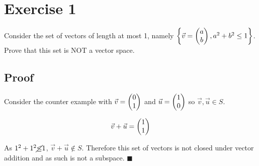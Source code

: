 \section*{Exercise 1}

Consider the set of vectors of length at most 1, namely $\left\{ \vec{v} =  \begin{pmatrix} a\\b \end{pmatrix} , a^2 + b^2 \leq 1 \right\}$. Prove that this set is NOT a vector space.

\subsection*{Proof}

Consider the counter example with $\vec{v} =  \begin{pmatrix} 0\\1 \end{pmatrix} $ and $\vec{u} =  \begin{pmatrix} 1\\0 \end{pmatrix} $ so $\vec{v}, \vec{u} \in S$.

\[
	\begin{aligned}
		\vec{v} + \vec{u} &=  \begin{pmatrix} 1\\1 \end{pmatrix}  \\
	\end{aligned}
\]

As $1^2 + 1^2 \cancel{\leq} 1$, $\vec{v} + \vec{u} \notin S$. Therefore this set of vectors is not closed under vector addition and as such is not a subspace. $\blacksquare$ 

